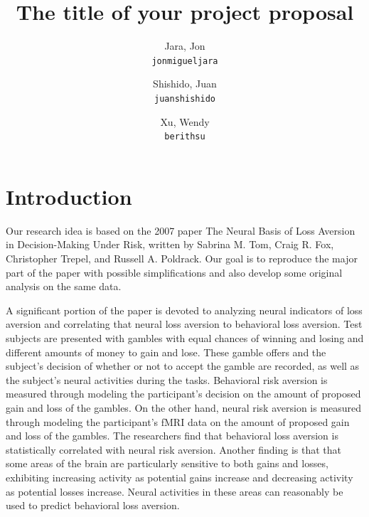\documentclass[11pt]{article}
\title{The title of your project proposal}
\author{
  Jara, Jon\\
  \texttt{jonmigueljara}
  \and
  Shishido, Juan\\
  \texttt{juanshishido}
  \and
  Xu, Wendy\\
  \texttt{berithsu}
}
\begin{document}
\maketitle


\section{Introduction}

Our research idea is based on the 2007 paper The Neural Basis of
Loss Aversion in Decision-Making Under Risk, written by Sabrina M. Tom, Craig
R. Fox, Christopher Trepel, and Russell A. Poldrack\cite{tom}. Our goal is to
reproduce the major part of the paper with possible simplifications and also
develop some original analysis on the same data.

A significant portion of the paper is devoted to analyzing neural
indicators of loss aversion and correlating that neural loss aversion to
behavioral loss aversion. Test subjects are presented with gambles with equal
chances of winning and losing and different amounts of money to gain and lose.
These gamble offers and the subject’s decision of whether or not to accept the
gamble are recorded, as well as the subject’s neural activities during the
tasks. Behavioral risk aversion is measured through modeling the participant’s
decision on the amount of proposed gain and loss of the gambles. On the other
hand, neural risk aversion is measured through modeling the participant’s fMRI
data on the amount of proposed gain and loss of the gambles. The researchers
find that behavioral loss aversion is statistically correlated with neural risk
aversion. Another finding is that that some areas of the brain are particularly
sensitive to both gains and losses, exhibiting increasing activity as potential
gains increase and decreasing activity as potential losses increase. Neural
activities in these areas can reasonably be used to predict behavioral loss
aversion.
\end{document}
